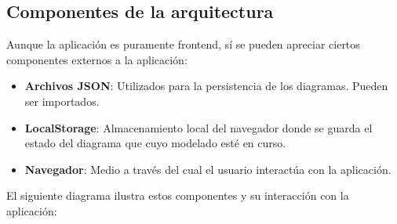 \subsection{Componentes de la arquitectura}
Aunque la aplicación es puramente frontend, sí se pueden apreciar ciertos componentes externos a la aplicación:
\begin{itemize}
    \item \textbf{Archivos JSON}: Utilizados para la persistencia de los diagramas. Pueden ser importados.
    \item \textbf{LocalStorage}: Almacenamiento local del navegador donde se guarda el estado del diagrama que cuyo modelado esté en curso.
    \item \textbf{Navegador}: Medio a través del cual el usuario interactúa con la aplicación.
\end{itemize}

El siguiente diagrama ilustra estos componentes y su interacción con la aplicación:

